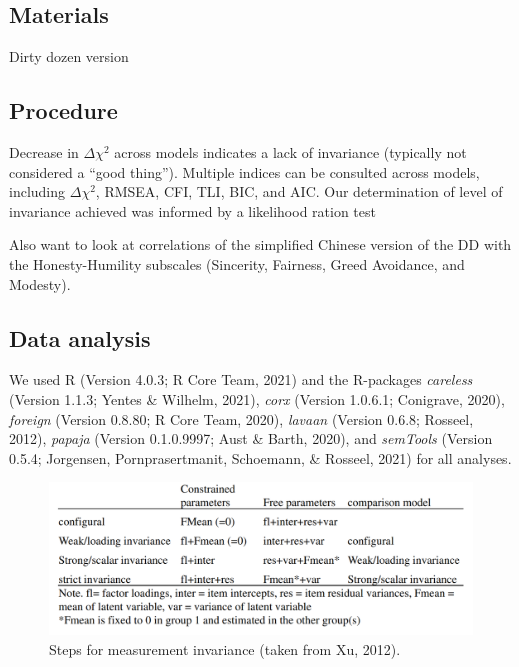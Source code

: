 \documentclass[
  english,
  man]{apa6}
\begin{document}
\hypertarget{materials}{%
\subsection{Materials}\label{materials}}

Dirty dozen version

\hypertarget{procedure}{%
\subsection{Procedure}\label{procedure}}

Decrease in \(\Delta\chi^2\) across models indicates a lack of invariance (typically not considered a \enquote{good thing}). Multiple indices can be consulted across models, including \(\Delta\chi^2\), RMSEA, CFI, TLI, BIC, and AIC. Our determination of level of invariance achieved was informed by a likelihood ration test

Also want to look at correlations of the simplified Chinese version of the DD with the Honesty-Humility subscales (Sincerity, Fairness, Greed Avoidance, and Modesty).

\hypertarget{data-analysis}{%
\subsection{Data analysis}\label{data-analysis}}

We used R (Version 4.0.3; R Core Team, 2021) and the R-packages \emph{careless} (Version 1.1.3; Yentes \& Wilhelm, 2021), \emph{corx} (Version 1.0.6.1; Conigrave, 2020), \emph{foreign} (Version 0.8.80; R Core Team, 2020), \emph{lavaan} (Version 0.6.8; Rosseel, 2012), \emph{papaja} (Version 0.1.0.9997; Aust \& Barth, 2020), and \emph{semTools} (Version 0.5.4; Jorgensen, Pornprasertmanit, Schoemann, \& Rosseel, 2021) for all analyses.

\begin{figure}
\includegraphics[width=4.71in]{steps} \caption{Steps for measurement invariance (taken from Xu, 2012).}\label{fig:figure1}
\end{figure}
\end{document}
